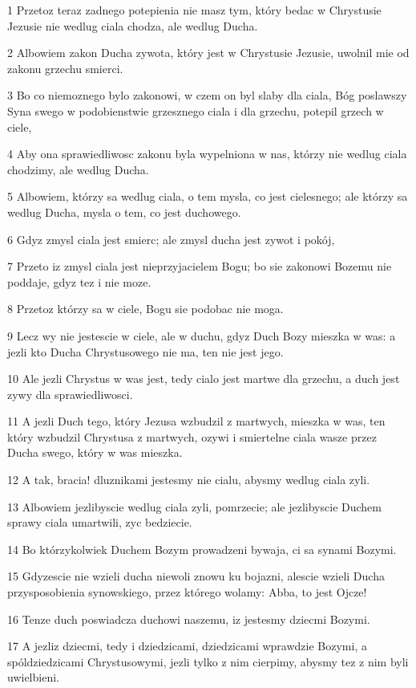\par 1 Przetoz teraz zadnego potepienia nie masz tym, który bedac w Chrystusie Jezusie nie wedlug ciala chodza, ale wedlug Ducha.
\par 2 Albowiem zakon Ducha zywota, który jest w Chrystusie Jezusie, uwolnil mie od zakonu grzechu smierci.
\par 3 Bo co niemoznego bylo zakonowi, w czem on byl slaby dla ciala, Bóg poslawszy Syna swego w podobienstwie grzesznego ciala i dla grzechu, potepil grzech w ciele,
\par 4 Aby ona sprawiedliwosc zakonu byla wypelniona w nas, którzy nie wedlug ciala chodzimy, ale wedlug Ducha.
\par 5 Albowiem, którzy sa wedlug ciala, o tem mysla, co jest cielesnego; ale którzy sa wedlug Ducha, mysla o tem, co jest duchowego.
\par 6 Gdyz zmysl ciala jest smierc; ale zmysl ducha jest zywot i pokój,
\par 7 Przeto iz zmysl ciala jest nieprzyjacielem Bogu; bo sie zakonowi Bozemu nie poddaje, gdyz tez i nie moze.
\par 8 Przetoz którzy sa w ciele, Bogu sie podobac nie moga.
\par 9 Lecz wy nie jestescie w ciele, ale w duchu, gdyz Duch Bozy mieszka w was: a jezli kto Ducha Chrystusowego nie ma, ten nie jest jego.
\par 10 Ale jezli Chrystus w was jest, tedy cialo jest martwe dla grzechu, a duch jest zywy dla sprawiedliwosci.
\par 11 A jezli Duch tego, który Jezusa wzbudzil z martwych, mieszka w was, ten który wzbudzil Chrystusa z martwych, ozywi i smiertelne ciala wasze przez Ducha swego, który w was mieszka.
\par 12 A tak, bracia! dluznikami jestesmy nie cialu, abysmy wedlug ciala zyli.
\par 13 Albowiem jezlibyscie wedlug ciala zyli, pomrzecie; ale jezlibyscie Duchem sprawy ciala umartwili, zyc bedziecie.
\par 14 Bo którzykolwiek Duchem Bozym prowadzeni bywaja, ci sa synami Bozymi.
\par 15 Gdyzescie nie wzieli ducha niewoli znowu ku bojazni, alescie wzieli Ducha przysposobienia synowskiego, przez którego wolamy: Abba, to jest Ojcze!
\par 16 Tenze duch poswiadcza duchowi naszemu, iz jestesmy dziecmi Bozymi.
\par 17 A jezliz dziecmi, tedy i dziedzicami, dziedzicami wprawdzie Bozymi, a spóldziedzicami Chrystusowymi, jezli tylko z nim cierpimy, abysmy tez z nim byli uwielbieni.

